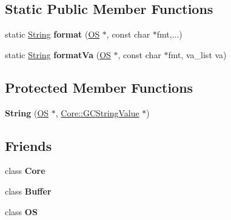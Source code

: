 \subsection*{Static Public Member Functions}
\begin{DoxyCompactItemize}
\item 
static \hyperlink{class_object_script_1_1_o_s_1_1_string}{String} {\bfseries format} (\hyperlink{class_object_script_1_1_o_s}{OS} $\ast$, const char $\ast$fmt,...)\hypertarget{class_object_script_1_1_o_s_1_1_string_ae4961d8e5e991dd9976fdc0e2c8753ff}{}\label{class_object_script_1_1_o_s_1_1_string_ae4961d8e5e991dd9976fdc0e2c8753ff}

\item 
static \hyperlink{class_object_script_1_1_o_s_1_1_string}{String} {\bfseries format\+Va} (\hyperlink{class_object_script_1_1_o_s}{OS} $\ast$, const char $\ast$fmt, va\+\_\+list va)\hypertarget{class_object_script_1_1_o_s_1_1_string_a668e1b308bdaf681d5152e1723233e0a}{}\label{class_object_script_1_1_o_s_1_1_string_a668e1b308bdaf681d5152e1723233e0a}

\end{DoxyCompactItemize}
\subsection*{Protected Member Functions}
\begin{DoxyCompactItemize}
\item 
{\bfseries String} (\hyperlink{class_object_script_1_1_o_s}{OS} $\ast$, \hyperlink{struct_object_script_1_1_o_s_1_1_core_1_1_g_c_string_value}{Core\+::\+G\+C\+String\+Value} $\ast$)\hypertarget{class_object_script_1_1_o_s_1_1_string_ac4337e50d0bba0661be7b8abe3e91643}{}\label{class_object_script_1_1_o_s_1_1_string_ac4337e50d0bba0661be7b8abe3e91643}

\end{DoxyCompactItemize}
\subsection*{Friends}
\begin{DoxyCompactItemize}
\item 
class {\bfseries Core}\hypertarget{class_object_script_1_1_o_s_1_1_string_a4107254ac74f90d4f91e810d755b98c2}{}\label{class_object_script_1_1_o_s_1_1_string_a4107254ac74f90d4f91e810d755b98c2}

\item 
class {\bfseries Buffer}\hypertarget{class_object_script_1_1_o_s_1_1_string_a5ba04a2bf0ca34a0f845cd759950664d}{}\label{class_object_script_1_1_o_s_1_1_string_a5ba04a2bf0ca34a0f845cd759950664d}

\item 
class {\bfseries OS}\hypertarget{class_object_script_1_1_o_s_1_1_string_a9564a1cc322bc3c0b2bf8625ea5dfeb2}{}\label{class_object_script_1_1_o_s_1_1_string_a9564a1cc322bc3c0b2bf8625ea5dfeb2}

\end{DoxyCompactItemize}
